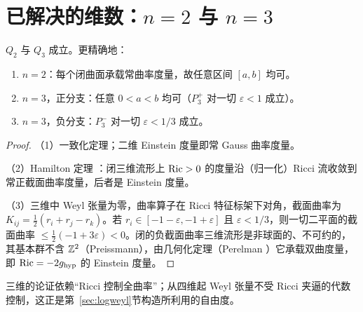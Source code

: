 \section{已解决的维数：$n=2$ 与 $n=3$}\label{sec:lowdim}

\begin{theorem}\label{thm:lowdim}
$Q_2$ 与 $Q_3$ 成立。更精确地：
\begin{enumerate}
\item $n=2$：每个闭曲面承载常曲率度量，故任意区间 $[a,b]$ 均可。
\item $n=3$，正分支：任意 $0<a<b$ 均可（$P_3^+$ 对一切 $\varepsilon<1$ 成立）。
\item $n=3$，负分支：$P_3^-$ 对一切 $\varepsilon<1/3$ 成立。
\end{enumerate}
\end{theorem}
\begin{proof}
（1）一致化定理；二维 Einstein 度量即常 Gauss 曲率度量。

（2）Hamilton 定理 \cite{Hamilton}：闭三维流形上 $\operatorname{Ric}>0$ 的度量沿（归一化）Ricci 流收敛到常正截面曲率度量，后者是 Einstein 度量。

（3）三维中 Weyl 张量为零，曲率算子在 Ricci 特征标架下对角，截面曲率为 $K_{ij}=\frac12(r_i+r_j-r_k)$。若 $r_i\in[-1-\varepsilon,-1+\varepsilon]$ 且 $\varepsilon<1/3$，则一切二平面的截面曲率 $\le\frac12(-1+3\varepsilon)<0$。闭的负截面曲率三维流形是非球面的、不可约的，其基本群不含 $\mathbb Z^2$（Preissmann），由几何化定理（Perelman \cite{Perelman}）它承载双曲度量，即 $\operatorname{Ric}=-2g_{\mathrm{hyp}}$ 的 Einstein 度量。
\end{proof}

三维的论证依赖“Ricci 控制全曲率”；从四维起 Weyl 张量不受 Ricci 夹逼的代数控制，这正是第~\ref{sec:logweyl}节构造所利用的自由度。
